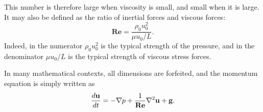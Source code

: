 This number is therefore large when viscosity is small, and small when
it is large. It may also be defined as the ratio of inertial forces and
viscous forces:
\begin{equation}
  \mathbf{Re}= \frac{\rho_ 0 u^2_0 }{\mu u_0 / L }.
\end{equation}
Indeed, in the numerator $\rho_ 0 u^2_0$ is the typical strength of the
pressure, and in the denominator $\mu u_0 / L $ is the typical
strength of viscous stress forces.

In many mathematical contexts, all dimensions are forfeited, and the
momentum equation is simply written as
\begin{equation}
  \label{eq:NS_usual_reduced}
  \frac{d\mathbf{u} }{dt} =
  - \nabla p 
  + \frac{1}{\mathbf{Re}} \nabla^2 \mathbf{u}
  + \mathbf{g} .
\end{equation}



